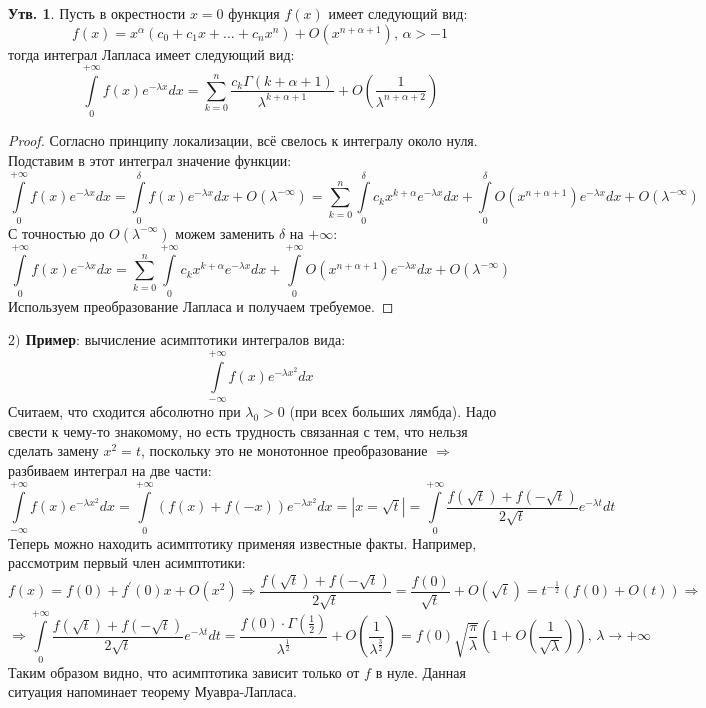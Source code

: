 \documentclass[12pt]{article}
\theoremstyle{definition}
\newtheorem{prop}{Утв.}
\newcommand{\ddint}[2]{\displaystyle\int\limits_{#1}^{#2}}
\begin{document}
\begin{prop}
	Пусть в окрестности $x = 0$ функция $f(x)$ имеет следующий вид:
	$$
		f(x) = x^{\alpha}\left(c_0 + c_1 x + \dotsc + c_n x^n \right) + O(x^{n + \alpha + 1}), \, \alpha > -1
	$$
	тогда интеграл Лапласа имеет следующий вид:
	$$
		\ddint{0}{+\infty}f(x)e^{-\lambda x}dx =\sum\limits_{k = 0}^n \dfrac{c_k \Gamma(k + \alpha + 1)}{\lambda^{k + \alpha + 1}} + O\left(\dfrac{1}{\lambda^{n + \alpha + 2}}\right)
	$$
\end{prop}
\begin{proof}
	Согласно принципу локализации, всё свелось к интегралу около нуля. Подставим в этот интеграл значение функции:
	$$
		\ddint{0}{+\infty}f(x)e^{-\lambda x}dx = \ddint{0}{\delta}f(x)e^{-\lambda x}dx + O(\lambda^{-\infty}) = \sum\limits_{k = 0}^n \ddint{0}{\delta}c_k x^{k + \alpha}e^{-\lambda x}dx + \ddint{0}{\delta}O\left(x^{n + \alpha + 1}\right)e^{-\lambda x}dx + O(\lambda^{-\infty})
	$$
	С точностью до $O(\lambda^{-\infty})$ можем заменить $\delta$ на $+\infty$:
	$$
		\ddint{0}{+\infty}f(x)e^{-\lambda x}dx =\sum\limits_{k = 0}^n \ddint{0}{+\infty}c_k x^{k + \alpha}e^{-\lambda x}dx + \ddint{0}{+\infty}O\left(x^{n + \alpha + 1}\right)e^{-\lambda x}dx + O(\lambda^{-\infty})
	$$
	Используем преобразование Лапласа и получаем требуемое.
\end{proof}

\textbf{$2)$ Пример}: вычисление асимптотики интегралов вида:
$$
	\ddint{-\infty}{+\infty}f(x)e^{-\lambda x^2}dx
$$
Считаем, что сходится абсолютно при $\lambda_0 > 0$ (при всех больших лямбда). Надо свести к чему-то знакомому, но есть трудность связанная с тем, что нельзя сделать замену $x^2 = t$, поскольку это не монотонное преобразование $\Rightarrow$ разбиваем интеграл на две части:
$$
	\ddint{-\infty}{+\infty}f(x)e^{-\lambda x^2}dx = \ddint{0}{+\infty}\left(f(x) + f(-x)\right)e^{-\lambda x^2}dx = \left|x = \sqrt{t}\right| = \ddint{0}{+\infty}\dfrac{f\left(\sqrt{t}\right) + f\left(-\sqrt{t}\right)}{2\sqrt{t}}e^{-\lambda t}dt 
$$	
Теперь можно находить асимптотику применяя известные факты. Например, рассмотрим первый член асимптотики:
$$
	f(x) = f(0) + f^\prime(0)x + O(x^2) \Rightarrow \dfrac{f\left(\sqrt{t}\right) + f\left(-\sqrt{t}\right)}{2\sqrt{t}} = \dfrac{f(0)}{\sqrt{t}} + O\left(\sqrt{t}\right) = t^{-\tfrac{1}{2}}\left(f(0) + O(t)\right) \Rightarrow
$$
$$
	\Rightarrow \ddint{0}{+\infty}\dfrac{f\left(\sqrt{t}\right) + f\left(-\sqrt{t}\right)}{2\sqrt{t}}e^{-\lambda t}dt = \dfrac{f(0){\cdot}\Gamma\left(\tfrac{1}{2}\right)}{\lambda^{\tfrac{1}{2}}}
	+ O\left(\dfrac{1}{\lambda^{\tfrac{3}{2}}}\right) = 
	f(0)\sqrt{\dfrac{\pi}{\lambda}}\left(1 + O\left(\dfrac{1}{\sqrt{\lambda}}\right) \right), \, \lambda \to +\infty
$$
Таким образом видно, что асимптотика зависит только от $f$ в нуле. Данная ситуация напоминает теорему Муавра-Лапласа.
\end{document}
